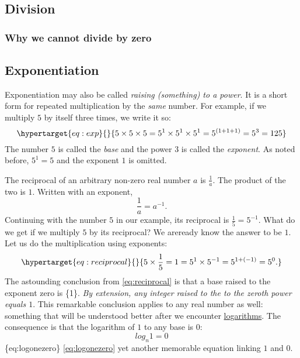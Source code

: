 \documentclass[
  a4paper,
]{article}
\begin{document}
\hypertarget{division}{%
\subsection{Division}\label{division}}

\hypertarget{why-we-cannot-divide-by-zero}{%
\subsubsection{Why we cannot divide by
zero}\label{why-we-cannot-divide-by-zero}}

\hypertarget{exponentiation}{%
\subsection{Exponentiation}\label{exponentiation}}

Exponentiation may also be called \emph{raising (something) to a power}.
It is a short form for repeated multiplication by the \emph{same}
number. For example, if we multiply \(5\) by itself three times, we
write it so: \begin{equation}\protect\hypertarget{eq:exp}{}{
5\times5\times5 = 5^1\times5^1\times5^1 = 5^{(1+1+1)} = 5^{3} = 125
}\label{eq:exp}\end{equation} The number \(5\) is called the \emph{base}
and the power \(3\) is called the \emph{exponent}. As noted before,
\(5^1 = 5\) and the exponent \(1\) is omitted.

The reciprocal of an arbitrary non-zero real number \(a\) is
\(\frac{1}{a}\). The product of the two is \(1\). Written with an
exponent, \[
\frac{1}{a} = a^{-1}.
\] Continuing with the number \(5\) in our example, its reciprocal is
\(\frac{1}{5} = 5^{-1}\). What do we get if we multiply \(5\) by its
reciprocal? We areready know the answer to be \(1\). Let us do the
multiplication using exponents:
\begin{equation}\protect\hypertarget{eq:reciprocal}{}{
5 \times \frac{1}{5} = 1 = 5^{1} \times 5^{-1} = 5^{1+(-1)} = 5^{0}.
}\label{eq:reciprocal}\end{equation} The astounding conclusion from
\cref{eq:reciprocal} is that a base raised to the exponent zero is
\{1\}. \emph{By extension, any integer raised to the to the zeroth power
equals \(1\)}. This remarkable conclusion applies to any real number as
well: something that will be understood better after we encounter
\href{https://www.britannica.com/science/logarithm}{logarithms}. The
consequence is that the logarithm of \(1\) to any base is \(0\): \[
log_{n}1 = 0
\]\{eq:logonezero\} \cref{eq:logonezero} yet another memorable equation
linking \(1\) and \(0\).
\end{document}
